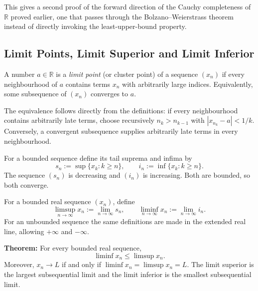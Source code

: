 \documentclass[a4paper,11pt,abstracton]{scrartcl}
\newcommand{\RR}{\mathbb{R}}
\theoremstyle{dotlessP}
\theoremstyle{dotlessS}
\theoremstyle{remark}
\theoremstyle{definition}
\begin{document}
This gives a second proof of the forward direction of the Cauchy completeness of $\RR$ proved earlier, one that passes through the Bolzano--Weierstrass theorem instead of directly invoking the least-upper-bound property.

\subsection{Limit Points, Limit Superior and Limit Inferior}

\begin{definition_box}
A number $a\in\RR$ is a \emph{limit point} (or cluster point) of a
sequence $(x_n)$ if every neighbourhood of $a$ contains terms $x_n$
with arbitrarily large indices. Equivalently, some subsequence of
$(x_n)$ converges to $a$.
\end{definition_box}

The equivalence follows directly from the definitions: if every
neighbourhood contains arbitrarily late terms, choose recursively
$n_k>n_{k-1}$ with $|x_{n_k}-a|<1/k$. Conversely, a convergent
subsequence supplies arbitrarily late terms in every neighbourhood.

For a bounded sequence define its tail suprema and infima by
\[
 s_n:=\sup\{x_k:k\ge n\},\qquad
 i_n:=\inf\{x_k:k\ge n\}.
\]
The sequence $(s_n)$ is decreasing and $(i_n)$ is increasing. Both are
bounded, so both converge.

\begin{definition_box}
For a bounded real sequence $(x_n)$, define
\[
 \limsup_{n\to\infty}x_n:=\lim_{n\to\infty}s_n,
 \qquad
 \liminf_{n\to\infty}x_n:=\lim_{n\to\infty}i_n.
\]
For an unbounded sequence the same definitions are made in the
extended real line, allowing $+\infty$ and $-\infty$.
\end{definition_box}

\begin{problem_box}
\textbf{Theorem:} For every bounded real sequence,
\[
 \liminf x_n\le\limsup x_n.
\]
Moreover, $x_n\to L$ if and only if
$\liminf x_n=\limsup x_n=L$.
The limit superior is the largest subsequential limit and the limit
inferior is the smallest subsequential limit.
\end{problem_box}
\end{document}

